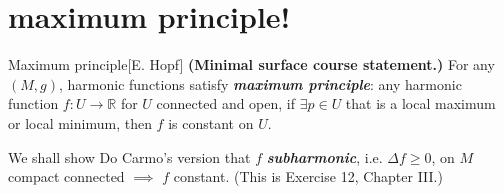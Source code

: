 \section{maximum principle!}

\begin{thing7}{Maximum principle}[E. Hopf]\leavevmode
\textbf{(Minimal surface course statement.)} For any \((M,g)\), harmonic functions satisfy \textit{\textbf{maximum principle}}: any harmonic function \(f:U \to \mathbb{R}\) for \(U\) connected and open, if \(\exists p \in U\) that is a local maximum or local minimum, then \(f\) is constant on \(U\).

We shall show Do Carmo's version that \(f\) \textit{\textbf{subharmonic}}, i.e. \(\Delta f\geq 0\), on \(M\) compact connected \(\implies\) \(f\) constant. (This is Exercise 12, Chapter III.)
\end{thing7}

